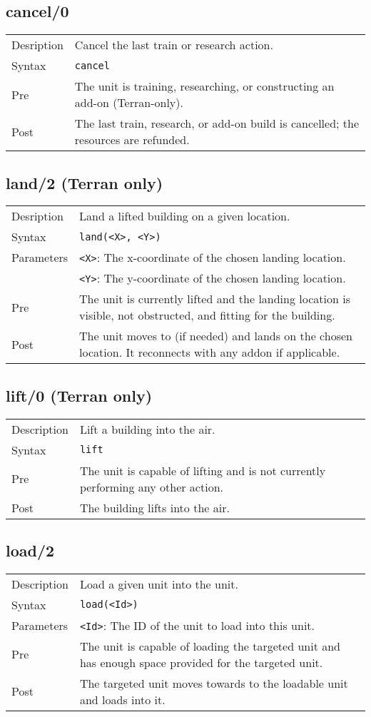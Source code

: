 \subsection{cancel/0}
\begin{tabularx}{\textwidth}{lX}
 Desription & Cancel the last train or research action. \\
 Syntax & \verb|cancel| \\
 Pre & The unit is training, researching, or constructing an add-on (Terran-only). \\
 Post & The last train, research, or add-on build is cancelled; the resources are refunded.
\end{tabularx}

\subsection{land/2 (Terran only)}
\begin{tabularx}{\textwidth}{lX}
 Desription & Land a lifted building on a given location. \\
 Syntax & \verb|land(<X>, <Y>)| \\
 Parameters & \verb|<X>|: The x-coordinate of the chosen landing location. \\
            & \verb|<Y>|: The y-coordinate of the chosen landing location. \\
 Pre & The unit is currently lifted and the landing location is visible, not obstructed, and fitting for the building. \\
 Post & The unit moves to (if needed) and lands on the chosen location. It reconnects with any addon if applicable.
\end{tabularx}

\subsection{lift/0 (Terran only)}
\begin{tabularx}{\textwidth}{lX}
 Description & Lift a building into the air. \\
 Syntax & \verb|lift| \\
 Pre & The unit is capable of lifting and is not currently performing any other action. \\
 Post & The building lifts into the air.
\end{tabularx}

\subsection{load/2}
\begin{tabularx}{\textwidth}{lX}
 Description & Load a given unit into the unit. \\
 Syntax & \verb|load(<Id>)| \\
 Parameters & \verb|<Id>|: The ID of the unit to load into this unit. \\
 Pre & The unit is capable of loading the targeted unit and has enough space provided for the targeted unit. \\
 Post & The targeted unit moves towards to the loadable unit and loads into it.
\end{tabularx}

